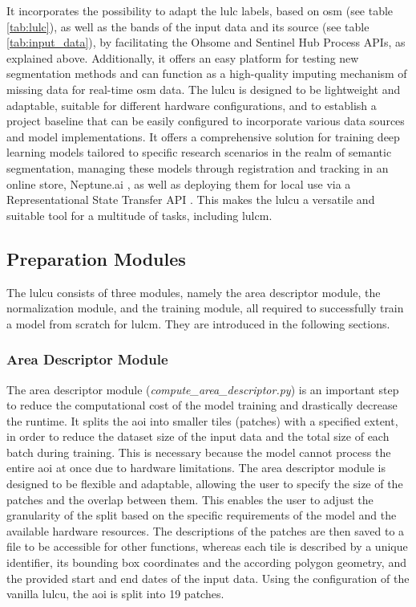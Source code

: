 It incorporates the possibility to adapt the \gls{lulc} labels, based on \gls{osm} (see table \ref{tab:lulc}), as well as the bands of the input data and its source (see table \ref{tab:input_data}), by facilitating the Ohsome and Sentinel Hub Process APIs, as explained above. Additionally, it offers an easy platform for testing new segmentation methods and can function as a high-quality imputing mechanism of missing data for real-time \gls{osm} data. The \gls{lulcu} is designed to be lightweight and adaptable, suitable for different hardware configurations, and to establish a project baseline that can be easily configured to incorporate various data sources and model implementations. It offers a comprehensive solution for training deep learning models tailored to specific research scenarios in the realm of semantic segmentation, managing these models through registration and tracking in an online store, Neptune.ai \autocite{NeptuneLabs2024}, as well as deploying them for local use via a Representational State Transfer API \autocite{HeiGIT2024a}. This makes the \gls{lulcu} a versatile and suitable tool for a multitude of tasks, including \gls{lulcm}.

\subsection{Preparation Modules}

The \gls{lulcu} consists of three modules, namely the area descriptor module, the normalization module, and the training module, all required to successfully train a model from scratch for \gls{lulcm}. They are introduced in the following sections.

\subsubsection*{Area Descriptor Module}

The area descriptor module (\emph{compute\_area\_descriptor.py}) is an important step to reduce the computational cost of the model training and drastically decrease the runtime. It splits the \gls{aoi} into smaller tiles (patches) with a specified extent, in order to reduce the dataset size of the input data and the total size of each batch during training. This is necessary because the model cannot process the entire \gls{aoi} at once due to hardware limitations. The area descriptor module is designed to be flexible and adaptable, allowing the user to specify the size of the patches and the overlap between them. This enables the user to adjust the granularity of the split based on the specific requirements of the model and the available hardware resources. The descriptions of the patches are then saved to a file to be accessible for other functions, whereas each tile is described by a unique identifier, its bounding box coordinates and the according polygon geometry, and the provided start and end dates of the input data. Using the configuration of the vanilla \gls{lulcu}, the \gls{aoi} is split into 19 patches. 


